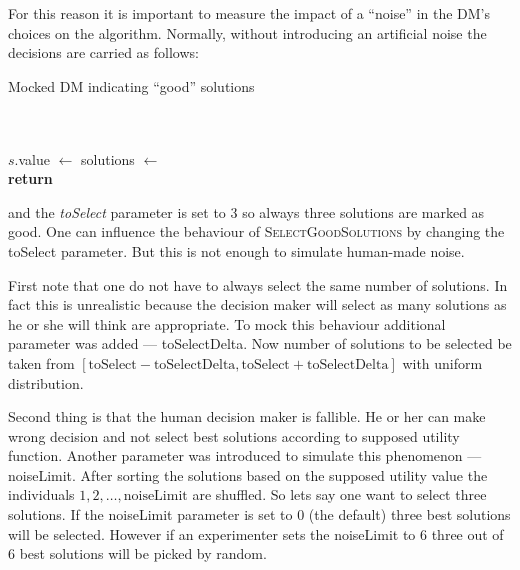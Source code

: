For this reason it is important to measure the impact of a ``noise'' in the
DM's choices on the algorithm. Normally, without introducing an artificial
noise the decisions are carried as follows:

\begin{algorithm}
\caption{Mocked DM indicating ``good'' solutions}\label{alg:dmselection}
  \begin{algorithmic}[1]
     \\
     \\
    \State $s.$value $\gets$ 
    \EndFor
    \State solutions $\gets$  \\
    \State \textbf{return} 
    \EndProcedure
  \end{algorithmic}
\end{algorithm}

and the \textit{toSelect} parameter is set to $3$ so always three solutions
are marked as good. One can influence the behaviour of
\textsc{SelectGoodSolutions} by changing the toSelect parameter. But this is
not enough to simulate human-made noise.

First note that one do not have to always select the same number of
solutions. In fact this is unrealistic because the decision maker will select
as many solutions as he or she will think are appropriate. To mock this
behaviour additional parameter was added --- toSelectDelta. Now number of
solutions to be selected be taken from $[\text{toSelect} -
  \text{toSelectDelta}, \text{toSelect} + \text{toSelectDelta}]$ with uniform
distribution.

Second thing is that the human decision maker is fallible. He or her can make
wrong decision and not select best solutions according to supposed utility
function. Another parameter was introduced to simulate this phenomenon ---
noiseLimit. After sorting the solutions based on the supposed utility value
the individuals $1, 2, \dots, \text{noiseLimit}$ are shuffled. So lets say one
want to select three solutions. If the noiseLimit parameter is set to $0$ (the
default) three best solutions will be selected. However if an experimenter
sets the noiseLimit to $6$ three out of $6$ best solutions will be picked by
random.

